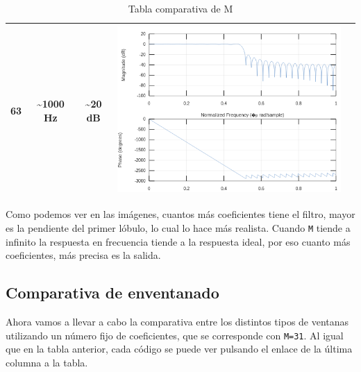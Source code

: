 \documentclass[11pt,a4paper]{article}
\begin{document}
\begin{table}[H]
\begin{tabular}{|c|c|c|c|c|}
63 & \textasciitilde{}1000 Hz            & \textasciitilde{}20 dB                       & \includegraphics[scale=0.3]{img/5.png} & \color{deepred}\nameref{code4}\color{black} \\ \hline
\end{tabular}
\caption{Tabla comparativa de M}
\end{table}

Como podemos ver en las imágenes, cuantos más coeficientes tiene el filtro, mayor es la pendiente del primer lóbulo, lo cual lo hace más realista. Cuando \texttt{M} tiende a infinito la respuesta en frecuencia tiende a la respuesta ideal, por eso cuanto más coeficientes, más precisa es la salida.

\subsection{Comparativa de enventanado}

Ahora vamos a llevar a cabo la comparativa entre los distintos tipos de ventanas utilizando un número fijo de coeficientes, que se corresponde con \texttt{M=31}. Al igual que en la tabla anterior, cada código se puede ver pulsando el enlace de la última columna a la tabla.
\end{document}
